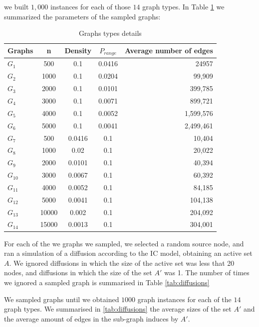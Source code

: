 \documentclass[sigconf,anonymous]{aamas}
\begin{document}
we built $1,000$ instances for each of those $14$ graph types. In Table \ref{tab:graphs} we summarized the parameters of the sampled graphs:


\begin{table}[hbpt]
  \caption{Graphs types details}
  \label{tab:graphs}
  \begin{tabular}{l c c c r}\toprule
    Graphs & n & Density &$P_{range}$ & Average number of edges \\ \midrule
    $G_1$& 500	& 0.1 & 0.0416 &	24957\\
    $G_2$& 1000 & 0.1 & 0.0204 & 99,909\\
    $G_3$& 2000	& 0.1 & 0.0101 & 399,785\\
    $G_4$& 3000	& 0.1 & 0.0071 &	899,721\\
    $G_5$& 4000 & 0.1 & 0.0052 &	1,599,576\\
    $G_6$& 5000 & 0.1 & 0.0041 & 2,499,461\\
    \midrule
    $G_7$&  500  &	0.0416 &	0.1 &	10,404\\
    $G_8$&  1000 &	0.02 &	    0.1	&   20,022\\
    $G_9$&  2000 &	0.0101 &	0.1	&    40,394\\
    $G_{10}$&3000 &	0.0067 &	0.1	&   60,392\\
    $G_{11}$&4000 &	0.0052 &	0.1	&   84,185\\
    $G_{12}$&5000 &	0.0041 &	0.1	&   104,138\\
    $G_{13}$&10000 &	0.002 &	0.1	&   204,092\\
    $G_{14}$&15000 &	0.0013 & 0.1 &	304,001\\

    
    \bottomrule
  \end{tabular}
\end{table}

For each of the we graphs we sampled, we selected a random source node, and ran a simulation of a diffusion according to the IC model, obtaining an active set $A$.
We ignored diffusions in which the size of the active set was less that 20 nodes, and diffusions in which the size of the set  $A'$ was 1. The number of times we ignored a sampled graph is summarised in Table \ref{tab:diffusions} 

We sampled graphs until we obtained $1000$ graph instances for each of the $14$ graph types.
We summarised in \ref{tab:diffusions} the average sizes of the set $A'$ and the average amount of edges in the sub-graph induces by $A'$.
\end{document}
